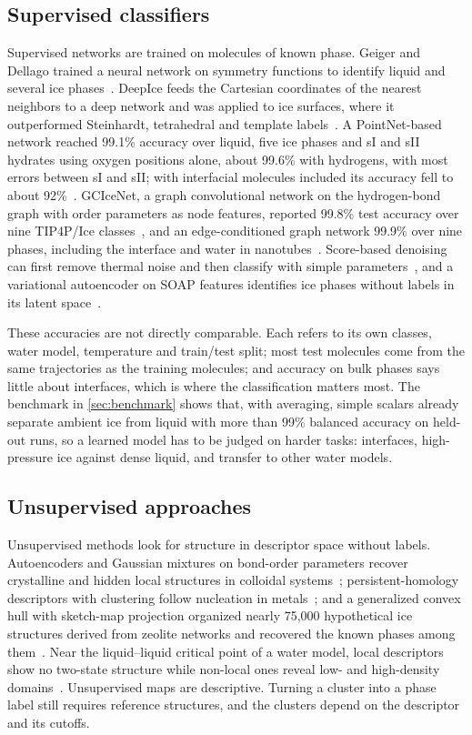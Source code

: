 \documentclass[11pt,a4paper]{article}
\begin{document}
\subsection{Supervised classifiers}
Supervised networks are trained on molecules of known phase. Geiger and
Dellago trained a neural network on symmetry functions to identify liquid and
several ice phases~\cite{Geiger2013}. DeepIce feeds the Cartesian coordinates
of the nearest neighbors to a deep network and was applied to ice surfaces,
where it outperformed Steinhardt, tetrahedral and template
labels~\cite{Fulford2019}. A PointNet-based network reached 99.1\% accuracy
over liquid, five ice phases and sI and sII hydrates using oxygen positions
alone, about 99.6\% with hydrogens, with most errors between sI and sII; with
interfacial molecules included its accuracy fell to about
92\%~\cite{DeFever2019}. GCIceNet, a graph convolutional network on the
hydrogen-bond graph with order parameters as node features, reported 99.8\%
test accuracy over nine TIP4P/Ice classes~\cite{Kim2020}, and an
edge-conditioned graph network 99.9\% over nine phases, including the
interface and water in nanotubes~\cite{Moradzadeh2023}. Score-based denoising
can first remove thermal noise and then classify with simple
parameters~\cite{Sun2024}, and a variational autoencoder on SOAP features
identifies ice phases without labels in its latent space~\cite{Maity2025}.

These accuracies are not directly comparable. Each refers to its own classes,
water model, temperature and train/test split; most test molecules come from
the same trajectories as the training molecules; and accuracy on bulk phases
says little about interfaces, which is where the classification matters most.
The benchmark in \cref{sec:benchmark} shows that, with averaging, simple
scalars already separate ambient ice from liquid with more than 99\% balanced
accuracy on held-out runs, so a learned model has to be judged on harder
tasks: interfaces, high-pressure ice against dense liquid, and transfer to
other water models.

\subsection{Unsupervised approaches}
Unsupervised methods look for structure in descriptor space without labels.
Autoencoders and Gaussian mixtures on bond-order parameters recover
crystalline and hidden local structures in colloidal
systems~\cite{Boattini2019,Boattini2020}; persistent-homology descriptors with
clustering follow nucleation in metals~\cite{Becker2022b,Becker2022}; and a
generalized convex hull with sketch-map projection organized nearly
75,000 hypothetical ice structures derived from zeolite networks and
recovered the known phases among them~\cite{Engel2018}. Near the
liquid--liquid critical point of a water model, local descriptors show no
two-state structure while non-local ones reveal low- and high-density
domains~\cite{Donkor2024}. Unsupervised maps are descriptive. Turning a
cluster into a phase label still requires reference structures, and the
clusters depend on the descriptor and its cutoffs.
\end{document}
